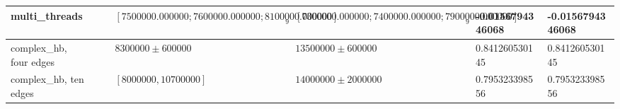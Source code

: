 \begin{tabular}{lllllll}
\hline{}multi\_threads       &                      &                      & $[7500000.000000; 7600000.000000; 8100000.000000]_{9}$ & $[7300000.000000; 7400000.000000; 7900000.000000]_{9}$ & -0.0156794346068
 & -0.0156794346068
\\
\hline{}complex\_hb, four edges &                      &                      & $8300000 \pm 600000$ & $13500000 \pm 600000$ & 0.841260530145
 & 0.841260530145
\\
\hline{}complex\_hb, ten edges &                      &                      & $[8000000, 10700000]$ & $14000000 \pm 2000000$ & 0.795323398556
 & 0.795323398556
\\
\end{tabular}
